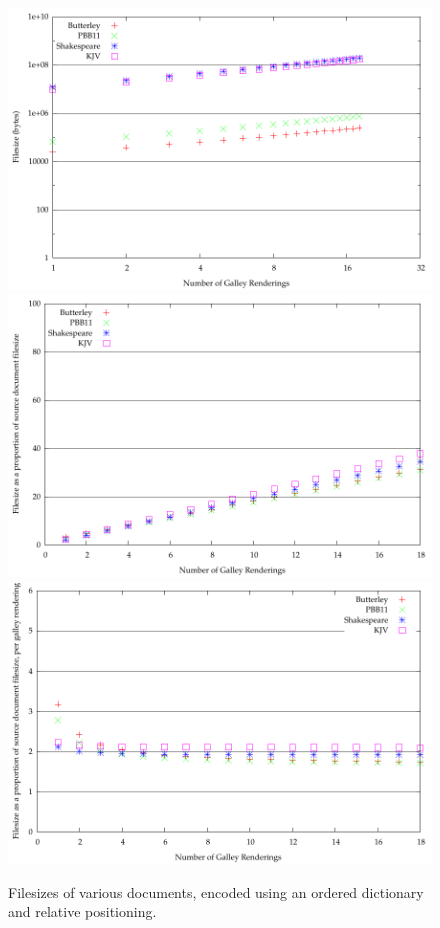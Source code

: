 \begin{figure}
  \begin{center}
  \includegraphics[width=\textwidth]{gnuplot/5-b}
  \includegraphics[width=\textwidth]{gnuplot/5-s}
  \includegraphics[width=\textwidth]{gnuplot/5-r}
  \end{center}
  \caption[Filesizes of documents with an ordered dictionary and relative positioning]{Filesizes of various documents, encoded using an ordered dictionary and relative positioning.}
  \label{fig:size-deltas}
\end{figure}


